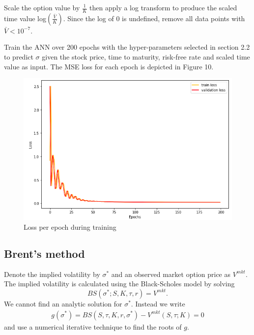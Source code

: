 \documentclass[12pt,a4paper]{article}
\begin{document}
Scale the option value by $\frac{1}{K}$ then apply a log transform to produce the scaled time value log$\left(\frac{\bar{V}}{K}\right)$. Since the log of 0 is undefined, remove all data points with $\bar{V} < 10^{-7}$.

Train the ANN over 200 epochs with the hyper-parameters selected in section 2.2 to predict $\sigma$ given the stock price, time to maturity, risk-free rate and scaled time value as input. The MSE loss for each epoch is depicted in Figure 10.

\begin{figure}[H]
    \centering
    \includegraphics[width=450pt]{impliedVolatilityANNTrainingGraph.png}
    \caption{Loss per epoch during training}
\end{figure}

\subsection{Brent's method}
Denote the implied volatility by $\sigma^*$ and an observed market option price as $V^{mkt}$. The implied volatility is calculated using the Black-Scholes model by solving
\[ BS(\sigma^*; S,K,\tau,r)=V^{mkt}. \]
We cannot find an analytic solution for $\sigma^*$. Instead we write
\begin{align}
    g(\sigma^*) = BS(S,\tau,K,r,\sigma^*)-V^{mkt}(S,\tau;K) = 0
\end{align}
and use a numerical iterative technique to find the roots of $g$.
\end{document}

